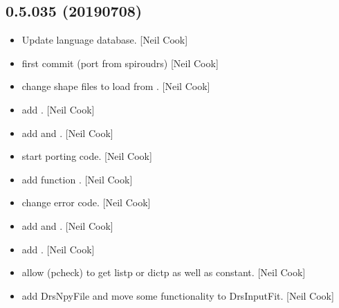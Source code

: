 \documentclass[a4paper,10pt,english]{report}
\begin{document}
\subsection{0.5.035 (2019\sphinxhyphen{}07\sphinxhyphen{}08)}
\label{\detokenize{misc/changelog:id124}}\begin{itemize}
\item {} 
Update language database. {[}Neil Cook{]}

\item {} 
 \sphinxhyphen{} first commit (port from spiroudrs) {[}Neil Cook{]}

\item {} 
 \sphinxhyphen{} change shape files to load from
. {[}Neil Cook{]}

\item {} 
 \sphinxhyphen{} add . {[}Neil Cook{]}

\item {} 
 \sphinxhyphen{} add  and .
{[}Neil Cook{]}

\item {} 
 \sphinxhyphen{} start porting code. {[}Neil
Cook{]}

\item {} 
 \sphinxhyphen{} add function . {[}Neil Cook{]}

\item {} 
 \sphinxhyphen{} change error code. {[}Neil Cook{]}

\item {} 
 \sphinxhyphen{} add  and . {[}Neil
Cook{]}

\item {} 
 \sphinxhyphen{} add . {[}Neil Cook{]}

\item {} 
 \sphinxhyphen{} allow  (pcheck) to get listp or dictp as well
as constant. {[}Neil Cook{]}

\item {} 
 \sphinxhyphen{} add DrsNpyFile and move some functionality to
DrsInputFit. {[}Neil Cook{]}


\end{itemize}
\end{document}
